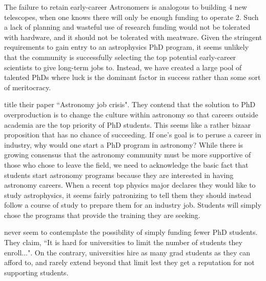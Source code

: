\documentclass[preprint2]{aastex}
\begin{document}
The failure to retain early-career Astronomers is analogous to building 4 new telescopes, when one knows there will only be enough funding to operate 2.  Such a lack of planning and wasteful use of research funding would not be tolerated with hardware, and it should not be tolerated with meatware. Given the stringent requirements to gain entry to an astrophysics PhD program, it seems unlikely that the community is successfully selecting the top potential early-career scientists to give long-term jobs to. Instead, we have created a large pool of talented PhDs where luck is the dominant factor in success rather than some sort of meritocracy. 



\citet{Cooray15} title their paper ``Astronomy job crisis".  They contend that the solution to PhD overproduction is to change the culture within astronomy so that careers outside academia are the top priority of PhD students. This seems like a rather bizaar proposition that has no chance of succeeding. If one's goal is to peruse a career in industry, why would one start a PhD program in astronomy? While there is growing consensus that the astronomy community must be more supportive of those who chose to leave the field, we need to acknowledge the basic fact that students start astronomy programs because they are interested in having astronomy careers.  When a recent top physics major declares they would like to study astrophysics, it seems fairly patronizing to tell them they should instead follow a course of study to prepare them for an industry job. Students will simply chose the programs that provide the training they are seeking.

\citet{Cooray15} never seem to contemplate the possibility of simply funding fewer PhD students. They claim, ``It is hard for universities to limit the number of students they enroll...". On the contrary, universities hire as many grad students as they can afford to, and rarely extend beyond that limit lest they get a reputation for not supporting students.  
\end{document}
